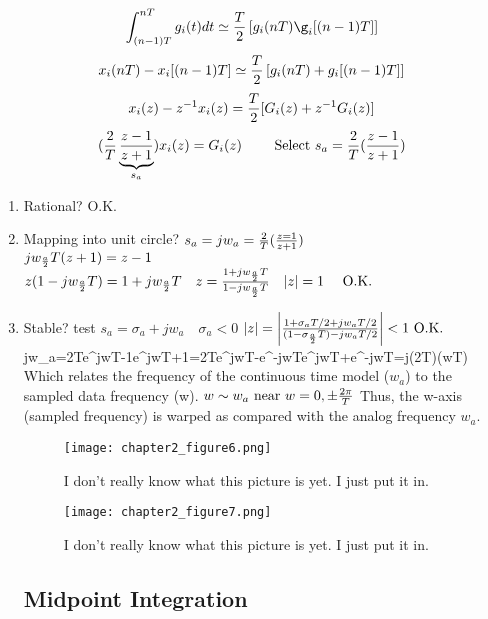 \documentclass[11pt,fleqn]{book} %
\begin{document}
$$\int_{(n-1)T}^{nT}g_i(t)dt\simeq{T\over 2}\left[g_i(nT)\g_i[(n-1)T]\right]$$
$$x_i(nT)-x_i[(n-1)T]\simeq{T\over 2}\left[g_i(nT)+g_i[(n-1)T]\right]$$
$$x_i(z)-z^{-1}x_i(z)={T\over 2}[G_i(z)+z^{-1}G_i(z)]$$
$$({2\over T}\underbrace{z-1\over z+1}_{s_a})x_i(z)=G_i(z)\qquad \text{ Select }s_a={2\over T}({z-1\over z+1})$$
\begin{enumerate}
 \item Rational? O.K.
 \item Mapping into unit circle? $s_a=jw_a={2\over T}({z=1\over z+1})$\\
$jw_{a\over 2}T(z+1)=z-1$\\
$z(1-jw_{a\over 2}T)=1+jw_{a\over 2}T\quad z={1+jw_{a\over 2}T\over 1-jw_{a\over 2}T} \quad |z|=1 \quad\text{ O.K.}$
\item Stable? test $s_a=\sigma_a+jw_a\quad\sigma_a<0$
$|z|=\left|{1+\sigma_aT/2+jw_aT/2\over(1-\sigma_{a\over 2}T)-jw_aT/2}\right|<1 \text{ O.K.}
$jw_a={2\over T}{e^{jwT}-1\over e^{jwT}+1}={2\over T}{e^{jwT}-e^{-jwT}\over e^{jwT}+e^{-jwT}}=j({2\over T})\tan({wT})$
$\therefore{}
Which relates the frequency of the continuous time model ($w_a$) to the sampled data frequency (w).
$w\sim w_a\text{ near }w=0,\pm{2\pi\over T}$
Thus, the w-axis (sampled frequency) is warped as compared with the analog frequency $w_a$.

\begin{figure}[h]
  \centering\texttt{[image: chapter2\_figure6.png]}
  \caption{I don't really know what this picture is yet. I just put it in.}
\end{figure}

\begin{figure}[h]
  \centering\texttt{[image: chapter2\_figure7.png]}
  \caption{I don't really know what this picture is yet. I just put it in.}
\end{figure}

\subsection{Midpoint Integration}


\end{enumerate}
\end{document}
